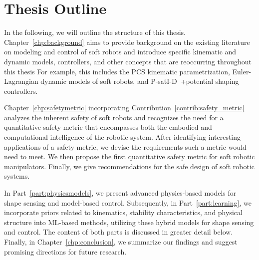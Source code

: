 \section{Thesis Outline}\label{sec:introduction:outline}
In the following, we will outline the structure of this thesis.
Chapter~\ref{chp:background} aims to provide background on the existing literature on modeling and control of soft robots and introduce specific kinematic and dynamic models, controllers, and other concepts that are reoccurring throughout this thesis
For example, this includes the \gls{PCS} kinematic parametrization, Euler-Lagrangian dynamic models of soft robots, and P-satI-D~\citep{pustina2022p}+potential shaping~\citep{della2023model} controllers.

Chapter~\ref{chp:safetymetric} incorporating Contribution~\ref{contrib:safety_metric} analyzes the inherent safety of soft robots and recognizes the need for a quantitative safety metric that encompasses both the embodied and computational intelligence of the robotic system. After identifying interesting applications of a safety metric, we devise the requirements such a metric would need to meet. We then propose the first quantitative safety metric for soft robotic manipulators. Finally, we give recommendations for the safe design of soft robotic systems.

In Part~\ref{part:physicsmodels}, we present advanced physics-based models for shape sensing and model-based control. Subsequently, in Part~\ref{part:learning}, we incorporate priors related to kinematics, stability characteristics, and physical structure into \gls{ML}-based methods, utilizing these hybrid models for shape sensing and control. The content of both parts is discussed in greater detail below. Finally, in Chapter~\ref{chp:conclusion}, we summarize our findings and suggest promising directions for future research.

